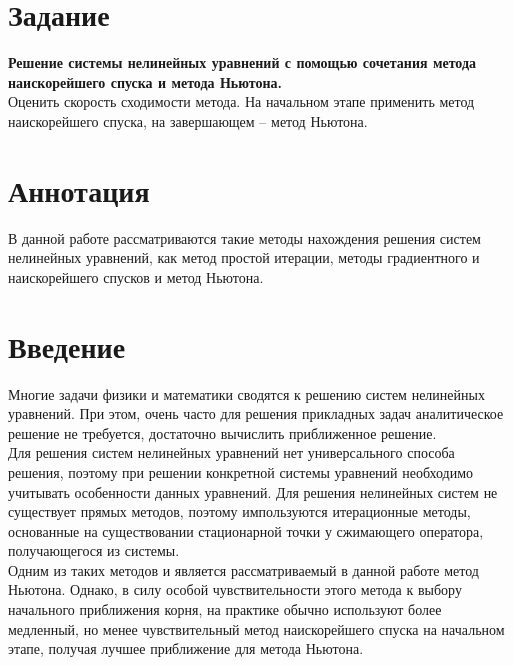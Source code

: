 \documentclass[a4paper, 12pt]{article}
\begin{document}
\tableofcontents
\newpage
\section*{Задание}
\textbf{Решение системы нелинейных уравнений с помощью сочетания
метода наискорейшего спуска и метода Ньютона.}\\
Оценить скорость сходимости метода. На начальном этапе применить
метод наискорейшего спуска, на завершающем – метод Ньютона.
\newpage
\section*{Аннотация}
В данной работе рассматриваются такие методы нахождения решения систем нелинейных уравнений, как метод простой итерации, методы градиентного и наискорейшего спусков и метод Ньютона.
\newpage
\section*{Введение}
Многие задачи физики и математики сводятся к решению систем нелинейных уравнений. При этом, очень часто для решения прикладных задач аналитическое решение не требуется, достаточно вычислить приближенное решение.\\
Для решения систем нелинейных уравнений нет универсального способа решения, поэтому при решении конкретной системы уравнений необходимо
учитывать особенности данных уравнений. Для решения нелинейных систем не существует прямых методов, поэтому импользуются итерационные методы, основанные на существовании стационарной точки у сжимающего оператора, получающегося из системы.\\
Одним из таких методов и является рассматриваемый в данной работе метод Ньютона. Однако, в силу особой чувствительности этого метода
к выбору начального приближения корня, на практике обычно используют более медленный, но менее чувствительный метод наискорейшего спуска
на начальном этапе, получая лучшее приближение для метода Ньютона.
\newpage
\end{document}

